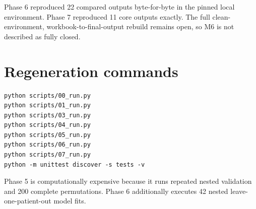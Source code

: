 Phase 6 reproduced 22 compared outputs byte-for-byte in the pinned local environment. Phase 7 reproduced 11 core outputs exactly. The full clean-environment, workbook-to-final-output rebuild remains open, so M6 is not described as fully closed.

\section{Regeneration commands}
\label{sec:regeneration_commands}

\begin{verbatim}
python scripts/00_run.py
python scripts/01_run.py
python scripts/03_run.py
python scripts/04_run.py
python scripts/05_run.py
python scripts/06_run.py
python scripts/07_run.py
python -m unittest discover -s tests -v
\end{verbatim}

Phase 5 is computationally expensive because it runs repeated nested validation and 200 complete permutations. Phase 6 additionally executes 42 nested leave-one-patient-out model fits.
